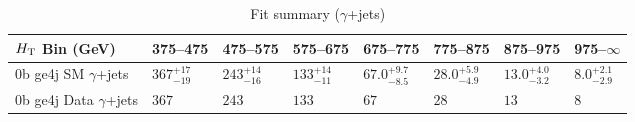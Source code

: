\documentclass[8pt]{article}
\def\scalht{\mbox{$H_{\rm{T}}$}\xspace}
\newcommand\T{\rule{0pt}{2.6ex}}
\begin{document}
\begin{table}[ht!]
\caption{Fit summary ($\gamma$+jets)}
\label{tab:ensemble-summary}
\centering
\begin{tabular}{ llllllll }

\hline
\scalht Bin (GeV)       & 375--475                       & 475--575                       & 575--675                       & 675--775                       & 775--875                       & 875--975                       & 975--$\infty$                  \\ [1.000000ex]
\hline
0b ge4j SM $\gamma$+jets\T & $367^{+17}_{-19}$              & $243^{+14}_{-16}$              & $133^{+14}_{-11}$              & $67.0^{+9.7}_{-8.5}$           & $28.0^{+5.9}_{-4.9}$           & $13.0^{+4.0}_{-3.2}$           & $8.0^{+2.1}_{-2.9}$            \\ 
0b ge4j Data $\gamma$+jets\T & $367$                          & $243$                          & $133$                          & $67$                           & $28$                           & $13$                           & $8$                            \\ 
\hline

\end{tabular}
\end{table}
\end{document}

